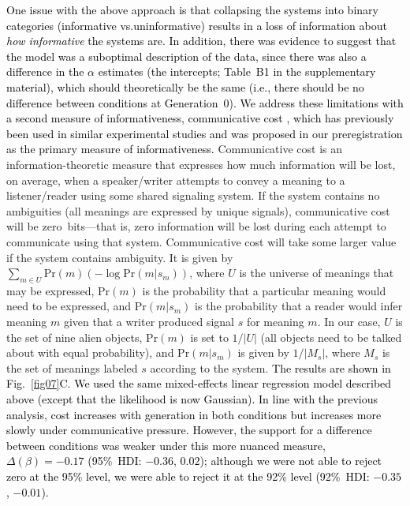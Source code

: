 \documentclass[doc,biblatex]{apa7}
\newcommand\newmaterial[1]{\textcolor{black}{#1}}
\newcommand\secondrevision[1]{\textcolor{black}{#1}}
\begin{document}
\newmaterial{One issue with the above approach is that collapsing the systems into binary categories (informative vs.\@ uninformative) results in a loss of information about \textit{how informative} the systems are. In addition, there was evidence to suggest that the model was a suboptimal description of the data, since there was also a difference in the $\alpha$ estimates (the intercepts\secondrevision{; Table~B1 in the supplementary material}), which should theoretically be the same (i.e., there should be no difference between conditions at Generation~0). We address these limitations with a second measure of informativeness, communicative cost \parencite{KempRegier:2012, Kemp:2018, Regier:2015}, which has previously been used in similar experimental studies \parencite{Carr:2020, Carstensen:2015, Smith:2020} and was proposed in our preregistration as the primary measure of informativeness.} Communicative cost is an information-theoretic measure that expresses how much information will be lost, on average, when a speaker/writer attempts to convey a meaning to a listener/reader using some shared signaling system. If the system contains no ambiguities (all meanings are expressed by unique signals), communicative cost will be zero~bits---that is, zero information will be lost during each attempt to communicate using that system. Communicative cost will take some larger value if the system contains ambiguity. It is given by $\sum_{m \in U} \mathrm{Pr}(m) ( -\log \mathrm{Pr}(m|s_m) )$, where $U$ is the universe of meanings that may be expressed, $\mathrm{Pr}(m)$ is the probability that a particular meaning would need to be expressed, and $\mathrm{Pr}(m|s_m)$ is the probability that a reader would infer meaning $m$ given that a writer produced signal $s$ for meaning $m$. In our case, $U$ is the set of nine alien objects, $\mathrm{Pr}(m)$ is set to $1/|U|$ (all objects need to be talked about with equal probability), and $\mathrm{Pr}(m|s_m)$ is given by $1/|M_s|$, where $M_s$ is the set of meanings labeled $s$ according to the system. \newmaterial{The results are shown in Fig.~\ref{fig07}C. We used the same mixed-effects linear regression model described above (except that the likelihood is now Gaussian). In line with the previous analysis, cost increases with generation in both conditions but increases more slowly under communicative pressure. However, the support for a difference between conditions was weaker under this more nuanced measure, $\Delta(\beta) = -0.17$ (95\%~HDI: $-0.36$, $0.02$); although we were not able to reject zero at the 95\% level, we were able to reject it at the 92\% level (92\%~HDI: $-0.35$, $-0.01$).}
\end{document}
